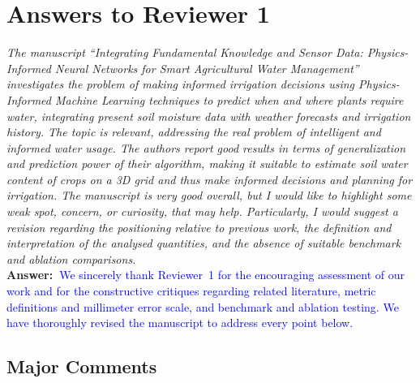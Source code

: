 \documentclass[10pt]{article}
\newcommand{\query}[2][]{\ifthenelse{\equal{#1}{}}{}{\textbf{#1:}~}\emph{#2}}
\newcommand{\ans}[1]{\textbf{Answer:~}#1}
\begin{document}
\section*{Answers to Reviewer 1}

\query[R-1.General]{The manuscript ``Integrating Fundamental Knowledge and Sensor Data: Physics-Informed Neural Networks for Smart Agricultural Water Management'' investigates the problem of making informed irrigation decisions using Physics-Informed Machine Learning techniques to predict when and where plants require water, integrating present soil moisture data with weather forecasts and irrigation history. The topic is relevant, addressing the real problem of intelligent and informed water usage. The authors report good results in terms of generalization and prediction power of their algorithm, making it suitable to estimate soil water content of crops on a 3D grid and thus make informed decisions and planning for irrigation. The manuscript is very good overall, but I would like to highlight some weak spot, concern, or curiosity, that may help. Particularly, I would suggest a revision regarding the positioning relative to previous work, the definition and interpretation of the analysed quantities, and the absence of suitable benchmark and ablation comparisons.}\\
\ans{\textcolor{blue}{We sincerely thank Reviewer~1 for the encouraging assessment of our work and for the constructive critiques regarding related literature, metric definitions and millimeter error scale, and benchmark and ablation testing. We have thoroughly revised the manuscript to address every point below.}}

\subsection*{Major Comments}
\end{document}
